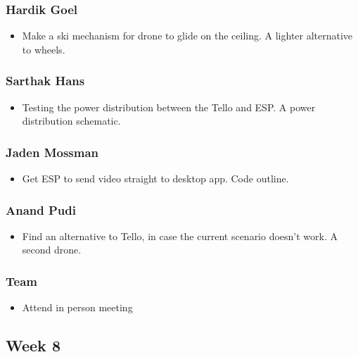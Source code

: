 \documentclass[12pt]{article}
\begin{document}
            \subsubsection*{Hardik Goel}
                \begin{itemize}
                    \item Make a ski mechanism for drone to glide on the ceiling. A lighter alternative to wheels.
                \end{itemize}
            \subsubsection*{Sarthak Hans}
                \begin{itemize}
                    \item Testing the power distribution between the Tello and ESP. A power distribution schematic.
                \end{itemize}
            \subsubsection*{Jaden Mossman}
                \begin{itemize}
                    \item Get ESP to send video straight to desktop app. Code outline.
                \end{itemize}
            \subsubsection*{Anand Pudi}
                \begin{itemize}
                    \item Find an alternative to Tello, in case the current scenario doesn't work. A second drone.
                \end{itemize}
            \subsubsection*{Team}
                \begin{itemize}
                    \item Attend in person meeting
                \end{itemize}
        
        \subsection*{Week 8}
\end{document}
